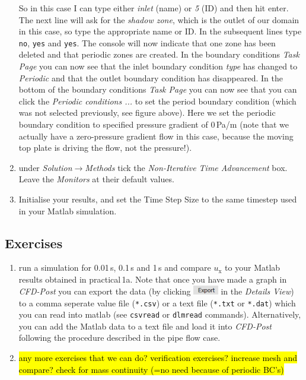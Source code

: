 \documentclass[11pt,a4paper,oneside,hidelinks]{scrartcl}
\begin{document}
\begin{enumerate}
So in this case I can type either \emph{inlet} (name) or \emph{5} (ID) and then hit enter. The next line will ask for the \emph{shadow zone}, which is the outlet of our domain in this case, so type the appropriate name or ID. In the subsequent lines type \texttt{no}, \texttt{yes} and \texttt{yes}. The console will now indicate that one zone has been deleted and that periodic zones are created. In the boundary conditions \emph{Task Page} you can now see that the inlet boundary condition \emph{type} has changed to \emph{Periodic} and that the outlet boundary condition has disappeared. In the bottom of the boundary conditions \emph{Task Page} you can now see that you can click the \emph{Periodic conditions ...} to set the period boundary condition (which was not selected previously, see figure above). Here we set the periodic boundary condition to specified pressure gradient of 0\,Pa/m (note that we actually have a zero-pressure gradient flow in this case, because the moving top plate is driving the flow, not the pressure!).
\item under \emph{Solution$\rightarrow$Methods} tick the \emph{Non-Iterative Time Advancement} box. Leave the \emph{Monitors} at their default values.
\item Initialise your results, and set the Time Step Size to the same timestep used in your Matlab simulation. 
\end{enumerate}


\subsection{Exercises}

\begin{enumerate}
\item run a simulation for 0.01\,s, 0.1\,s and 1\,s and compare $u_\mathrm{x}$ to your Matlab results obtained in practical\,1a. Note that once you have made a graph in \emph{CFD-Post} you can export the data (by clicking \includegraphics[width=1.1cm,clip]{export_icon.png} in the \emph{Details View}) to a comma seperate value file (\texttt{*.csv}) or a text file (\texttt{*.txt} or \texttt{*.dat}) which you can read into matlab (see \texttt{csvread} or \texttt{dlmread} commands). Alternatively, you can add the Matlab data to a text file and load it into \emph{CFD-Post} following the procedure described in the pipe flow case. 
\item \hl{any more exercises that we can do? verification exercises? increase mesh and compare? check for mass continuity (=no need because of periodic BC's)}
\end{enumerate}
\end{document}
